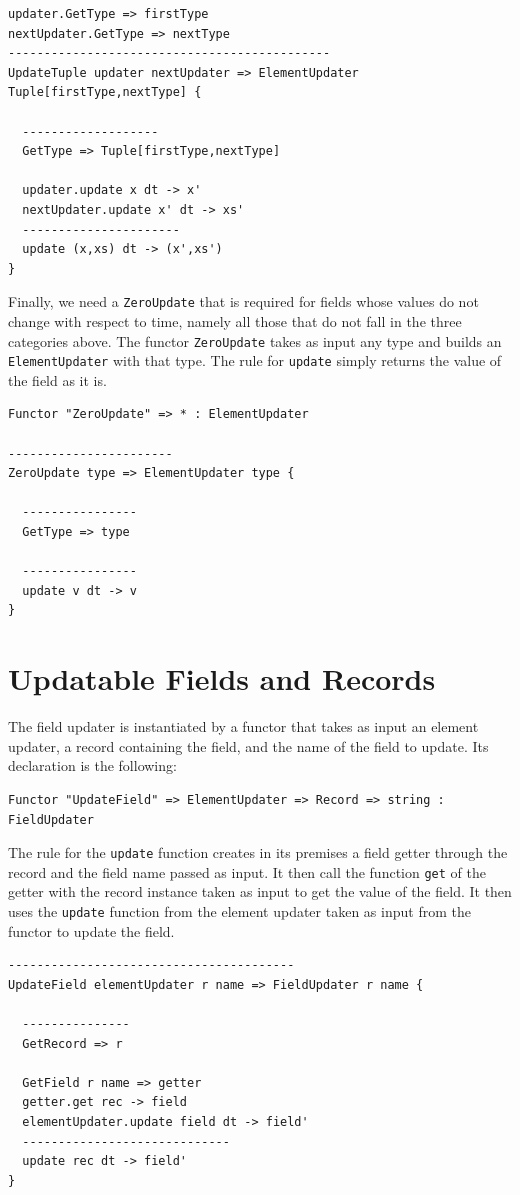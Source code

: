 \begin{lstlisting}
updater.GetType => firstType
nextUpdater.GetType => nextType
---------------------------------------------
UpdateTuple updater nextUpdater => ElementUpdater Tuple[firstType,nextType] {

  -------------------
  GetType => Tuple[firstType,nextType]

  updater.update x dt -> x'
  nextUpdater.update x' dt -> xs'
  ----------------------
  update (x,xs) dt -> (x',xs')
}
\end{lstlisting}

Finally, we need a \texttt{ZeroUpdate} that is required for fields whose values do not change with respect to time, namely all those that do not fall in the three categories above. The functor \texttt{ZeroUpdate} takes as input any type and builds an \texttt{ElementUpdater} with that type. The rule for \texttt{update} simply returns the value of the field as it is.

\begin{lstlisting}
Functor "ZeroUpdate" => * : ElementUpdater

-----------------------
ZeroUpdate type => ElementUpdater type {

  ----------------
  GetType => type

  ----------------
  update v dt -> v
}
\end{lstlisting}

\section{Updatable Fields and Records}
The field updater is instantiated by a functor that takes as input an element updater, a record containing the field, and the name of the field to update. Its declaration is the following:

\begin{lstlisting}
Functor "UpdateField" => ElementUpdater => Record => string : FieldUpdater
\end{lstlisting} 

\noindent
The rule for the \texttt{update} function creates in its premises a field getter through the record and the field name passed as input. It then call the function \texttt{get} of the getter with the record instance taken as input to get the value of the field. It then uses the \texttt{update} function from the element updater taken as input from the functor to update the field.

\begin{lstlisting}
----------------------------------------
UpdateField elementUpdater r name => FieldUpdater r name {

  ---------------
  GetRecord => r

  GetField r name => getter
  getter.get rec -> field
  elementUpdater.update field dt -> field' 
  -----------------------------
  update rec dt -> field'
}
\end{lstlisting}

